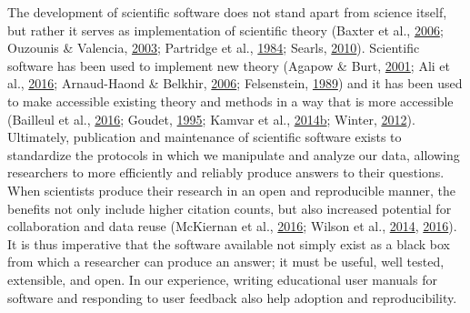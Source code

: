 \documentclass[double,11pt]{beavtex}
\begin{document}
  The development of scientific software does not stand apart from science
  itself, but rather it serves as implementation of scientific theory
  (Baxter et al., \protect\hyperlink{ref-baxter2006scientific}{2006};
  Ouzounis \& Valencia,
  \protect\hyperlink{ref-ouzounis2003bioinformatics}{2003}; Partridge et
  al., \protect\hyperlink{ref-partridge1984computer}{1984}; Searls,
  \protect\hyperlink{ref-searls2010roots}{2010}). Scientific software has
  been used to implement new theory (Agapow \& Burt,
  \protect\hyperlink{ref-Agapow_2001}{2001}; Ali et al.,
  \protect\hyperlink{ref-ali2016cloncase}{2016}; Arnaud-Haond \& Belkhir,
  \protect\hyperlink{ref-arnaud2006genclone}{2006}; Felsenstein,
  \protect\hyperlink{ref-felsenstein1989phylip}{1989}) and it has been
  used to make accessible existing theory and methods in a way that is
  more accessible (Bailleul et al.,
  \protect\hyperlink{ref-bailleul2016rclone}{2016}; Goudet,
  \protect\hyperlink{ref-goudet1995fstat}{1995}; Kamvar et al.,
  \protect\hyperlink{ref-kamvar2014poppr}{2014}\protect\hyperlink{ref-kamvar2014poppr}{b};
  Winter, \protect\hyperlink{ref-winter2012mmod}{2012}). Ultimately,
  publication and maintenance of scientific software exists to standardize
  the protocols in which we manipulate and analyze our data, allowing
  researchers to more efficiently and reliably produce answers to their
  questions. When scientists produce their research in an open and
  reproducible manner, the benefits not only include higher citation
  counts, but also increased potential for collaboration and data reuse
  (McKiernan et al., \protect\hyperlink{ref-mckiernan2016open}{2016};
  Wilson et al., \protect\hyperlink{ref-wilson2014best}{2014},
  \protect\hyperlink{ref-wilson2016good}{2016}). It is thus imperative
  that the software available not simply exist as a black box from which a
  researcher can produce an answer; it must be useful, well tested,
  extensible, and open. In our experience, writing educational user
  manuals for software and responding to user feedback also help adoption
  and reproducibility.
  
\end{document}

